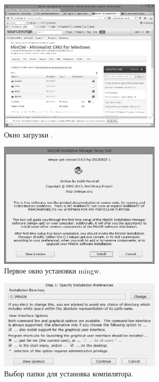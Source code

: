 \begin{figure}[htb]
\begin{center}
\includegraphics[width=0.7\textwidth]{img/ris_app_1}
\caption[Окно загрузки .]{Окно загрузки .}
\label{app:refDrawing0}
\end{center}
\end{figure}

\begin{figure}[htb]
\begin{center}
\includegraphics[width=0.7\textwidth]{img/ris_app_2}
\caption[Первое окно установки mingw.]{Первое окно установки mingw.}
\label{app:refDrawing1}
\end{center}
\end{figure}

\begin{figure}[htb]
\begin{center}
\includegraphics[width=0.7\textwidth]{img/ris_app_3}
\caption[Выбор папки для установка компилятора.]{Выбор папки для установка компилятора.}
\label{app:refDrawing2}
\end{center}
\end{figure}

